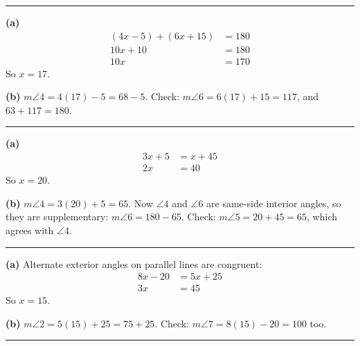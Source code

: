 \documentclass[12pt]{article}
\begin{document}
\vspace{0.2cm}\noindent\rule{\linewidth}{0.2pt}


\textbf{(a)}
\begin{align*}
  (4x - 5) + (6x + 15) &= 180 \\
  10x + 10 &= 180 \\
  10x &= 170
\end{align*}
So $x = 17$. 

\textbf{(b)} $m\angle 4 = 4(17) - 5 = 68 - 5$. Check: $m\angle 6 = 6(17) + 15 = 117$, and $63 + 117 = 180$. 

\vspace{0.2cm}\noindent\rule{\linewidth}{0.2pt}


\textbf{(a)}
\begin{align*}
  3x + 5 &= x + 45 \\
  2x &= 40
\end{align*}
So $x = 20$. 

\textbf{(b)} $m\angle 4 = 3(20) + 5 = 65$. Now $\angle 4$ and $\angle 6$ are same-side interior angles, so they are supplementary: $m\angle 6 = 180 - 65$. Check: $m\angle 5 = 20 + 45 = 65$, which agrees with $\angle 4$. 

\vspace{0.2cm}\noindent\rule{\linewidth}{0.2pt}


\textbf{(a)} Alternate exterior angles on parallel lines are congruent:
\begin{align*}
  8x - 20 &= 5x + 25 \\
  3x &= 45
\end{align*}
So $x = 15$. 

\textbf{(b)} $m\angle 2 = 5(15) + 25 = 75 + 25$. Check: $m\angle 7 = 8(15) - 20 = 100$ too. 

\vspace{0.2cm}\noindent\rule{\linewidth}{0.2pt}

\end{document}
